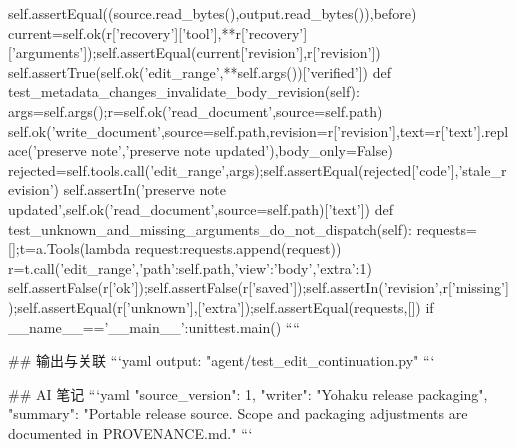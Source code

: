    self.assertEqual((source.read_bytes(),output.read_bytes()),before)
   current=self.ok(r['recovery']['tool'],**r['recovery']['arguments']);self.assertEqual(current['revision'],r['revision'])
  self.assertTrue(self.ok('edit_range',**self.args())['verified'])
 def test_metadata_changes_invalidate_body_revision(self):
  args=self.args();r=self.ok('read_document',source=self.path)
  self.ok('write_document',source=self.path,revision=r['revision'],text=r['text'].replace('preserve note','preserve note updated'),body_only=False)
  rejected=self.tools.call('edit_range',args);self.assertEqual(rejected['code'],'stale_revision')
  self.assertIn('preserve note updated',self.ok('read_document',source=self.path)['text'])
 def test_unknown_and_missing_arguments_do_not_dispatch(self):
  requests=[];t=a.Tools(lambda request:requests.append(request))
  r=t.call('edit_range',{'path':self.path,'view':'body','extra':1})
  self.assertFalse(r['ok']);self.assertFalse(r['saved']);self.assertIn('revision',r['missing']);self.assertEqual(r['unknown'],['extra']);self.assertEqual(requests,[])
if __name__=='__main__':unittest.main()
````

## 输出与关联
```yaml
output: "agent/test_edit_continuation.py"
```

## AI 笔记
```yaml
{"source_version": 1, "writer": "Yohaku release packaging", "summary": "Portable release source. Scope and packaging adjustments are documented in PROVENANCE.md."}
```

